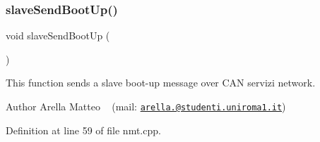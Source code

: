 \subsubsection{\texorpdfstring{slave\+Send\+Boot\+Up()}{slaveSendBootUp()}}
{\footnotesize\ttfamily void slave\+Send\+Boot\+Up (\begin{DoxyParamCaption}{ }\end{DoxyParamCaption})}



This function sends a slave boot-\/up message over C\+AN servizi network. 

\begin{DoxyAuthor}{Author}
Arella Matteo ~\newline
 (mail\+: \href{mailto:arella.1646983@studenti.uniroma1.it}{\tt arella.@studenti.\+uniroma1.\+it}) 
\end{DoxyAuthor}


Definition at line 59 of file nmt.\+cpp.

